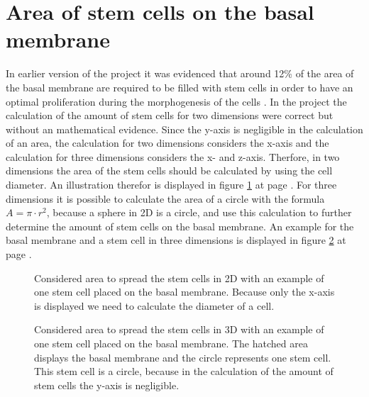 \section{Area of stem cells on the basal membrane}
In earlier version of the project it was evidenced that around 12\% of the area of the basal membrane are required to be filled with stem cells in order to have an optimal proliferation during the morphogenesis of the cells \cite{Torelli2017}.
In the project the calculation of the amount of stem cells for two dimensions were correct but without an mathematical evidence. \newline
Since the y-axis is negligible in the calculation of an area, the calculation for two dimensions considers the x-axis and the calculation for three dimensions considers the x- and z-axis. Therfore, in two dimensions the area of the stem cells should be calculated by using the cell diameter. An illustration therefor is displayed in figure \ref{tikz:AreaIn2D} at page \pageref{tikz:AreaIn2D}. For three dimensions it is possible to calculate the area of a circle with the formula $A = \pi \cdot r^{2}$, because a sphere in 2D is a circle, and use this calculation to further determine the amount of stem cells on the basal membrane. An example for the basal membrane and a stem cell in three dimensions is displayed in figure \ref{tikz:AreaIn3D} at page \pageref{tikz:AreaIn3D}. 

\begin{figure}[h]
\begin{center}
\caption{Considered area to spread the stem cells in 2D with an example of one stem cell placed on the basal membrane. Because only the x-axis is displayed we need to calculate the diameter of a cell.}
\label{tikz:AreaIn2D}
\end{center}
\end{figure}


\begin{figure}[h]
\begin{center}
\caption{Considered area to spread the stem cells in 3D with an example of one stem cell placed on the basal membrane. The hatched area displays the basal membrane and the circle represents one stem cell. This stem cell is a circle, because in the calculation of the amount of stem cells the y-axis is negligible.}
\label{tikz:AreaIn3D}
\end{center}
\end{figure}


